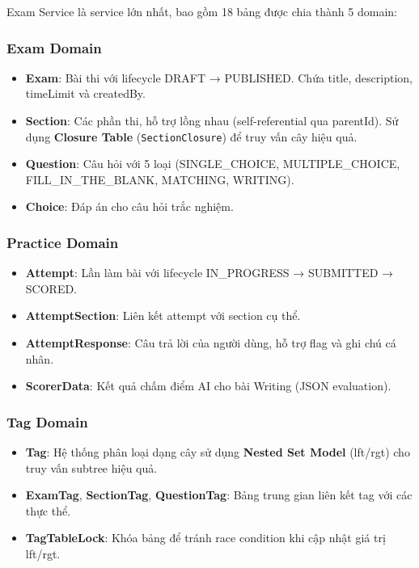 Exam Service là service lớn nhất, bao gồm 18 bảng được chia thành 5 domain:

\subsubsection{Exam Domain}
\begin{itemize}
    \item \textbf{Exam}: Bài thi với lifecycle DRAFT → PUBLISHED. Chứa title, description, timeLimit và createdBy.
    \item \textbf{Section}: Các phần thi, hỗ trợ lồng nhau (self-referential qua parentId). Sử dụng \textbf{Closure Table} (\texttt{SectionClosure}) để truy vấn cây hiệu quả.
    \item \textbf{Question}: Câu hỏi với 5 loại (SINGLE\_CHOICE, MULTIPLE\_CHOICE, FILL\_IN\_THE\_BLANK, MATCHING, WRITING).
    \item \textbf{Choice}: Đáp án cho câu hỏi trắc nghiệm.
\end{itemize}

\subsubsection{Practice Domain}
\begin{itemize}
    \item \textbf{Attempt}: Lần làm bài với lifecycle IN\_PROGRESS → SUBMITTED → SCORED.
    \item \textbf{AttemptSection}: Liên kết attempt với section cụ thể.
    \item \textbf{AttemptResponse}: Câu trả lời của người dùng, hỗ trợ flag và ghi chú cá nhân.
    \item \textbf{ScorerData}: Kết quả chấm điểm AI cho bài Writing (JSON evaluation).
\end{itemize}

\subsubsection{Tag Domain}
\begin{itemize}
    \item \textbf{Tag}: Hệ thống phân loại dạng cây sử dụng \textbf{Nested Set Model} (lft/rgt) cho truy vấn subtree hiệu quả.
    \item \textbf{ExamTag}, \textbf{SectionTag}, \textbf{QuestionTag}: Bảng trung gian liên kết tag với các thực thể.
    \item \textbf{TagTableLock}: Khóa bảng để tránh race condition khi cập nhật giá trị lft/rgt.
\end{itemize}

